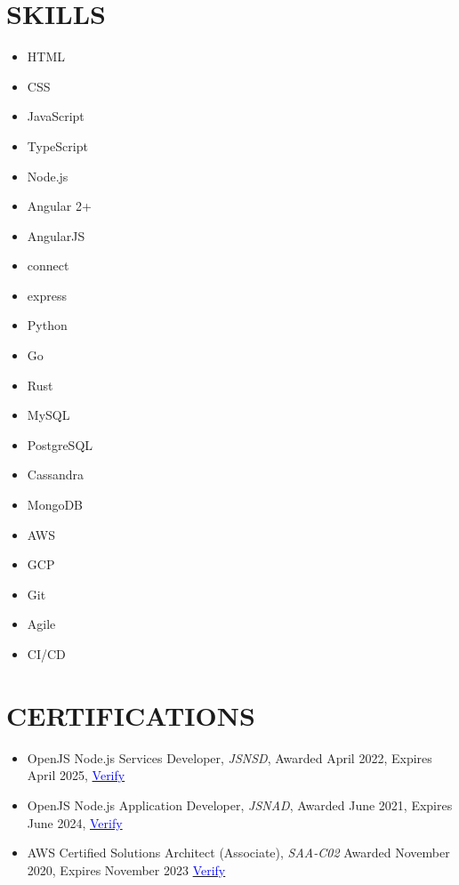 \documentclass[margin]{res}
\begin{document}
\begin{resume}
	\section{\textcolor{NavyBlue}{SKILLS}}
	\begin{multicols}{3}
		\begin{itemize}
			\item HTML
			\item CSS
			\item JavaScript
			\item TypeScript
			\item Node.js
			\item Angular 2+
			\item AngularJS
			\item connect
			\item express
			\item Python
			\item Go
			\item Rust
			\item MySQL
			\item PostgreSQL
			\item Cassandra
			\item MongoDB
			\item AWS
			\item GCP
			\item Git
			\item Agile
			\item CI/CD
		\end{itemize}
	\end{multicols}

	\section{\textcolor{NavyBlue}{CERTIFICATIONS}}
	\begin{itemize} %
		\item OpenJS Node.js Services Developer, \textit{JSNSD}, Awarded April 2022, Expires April 2025,
					\href{https://www.youracclaim.com/badges/d17570bd-2145-4cc2-9645-673fc3f6947e}{\textcolor{blue}{Verify}}

		\item OpenJS Node.js Application Developer, \textit{JSNAD}, Awarded June 2021, Expires June 2024,
		      \href{https://www.youracclaim.com/badges/76bcd62c-af5b-4957-b9ef-533403369d8d}{\textcolor{blue}{Verify}}

		\item AWS Certified Solutions Architect (Associate), \textit{SAA-C02} Awarded November 2020, Expires November 2023
		      \href{https://www.youracclaim.com/badges/4b572dd0-85e9-45f5-90f8-90a68cd3399f}{\textcolor{blue}{Verify}}


\end{itemize}
\end{resume}
\end{document}
